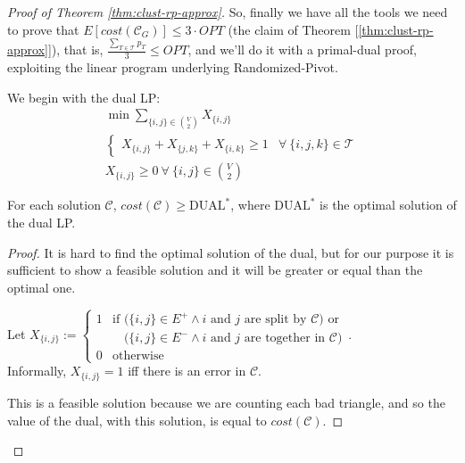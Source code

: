 \begin{proof}[Proof of Theorem \ref{thm:clust-rp-approx}]
    So, finally we have all the tools we need to prove that $E\left[cost\left( \mathscr{C}_G \right)\right] \leq 3 \cdot OPT$ (the claim of Theorem [\ref{thm:clust-rp-approx}]), that is, $\frac{\sum_{T \in \mathscr{T}} p_T}{3} \leq OPT$, and we'll do it with a primal-dual proof, exploiting the linear program underlying Randomized-Pivot.
    
    We begin with the dual LP:
    \begin{equation}\label{lp:clust-dual}
        \begin{aligned}
            &\min \sum_{\{i,j\} \in \binom{V}{2}} X_{\{i,j\}}&\\
            &\begin{cases}
                X_{\{i,j\}} + X_{\{j,k\}} + X_{\{i,k\}} \geq 1 & \forall\ \{i,j,k\} \in \mathscr{T}
            \end{cases}&\\
            &X_{\{i,j\}} \geq 0 \ \forall\ \{i,j\} \in \binom{V}{2}&
        \end{aligned}
    \end{equation}
    
    \begin{lem}\label{l:clust-3}
        For each solution $\mathscr{C}$, $cost(\mathscr{C}) \geq \text{DUAL}^*$, where $\text{DUAL}^*$ is the optimal solution of the dual LP.
    \end{lem}
    \begin{proof}
        It is hard to find the optimal solution of the dual, but for our purpose it is sufficient to show a feasible solution and it will be greater or equal than the optimal one.
        
        Let $X_{\{i,j\}} := \begin{cases}
        1 & \text{if } \big( \{i,j\} \in E^+ \wedge i \text{ and } j \text{ are split by } \mathscr{C} \big) \text{ or }\\
        &\phantom{\text{if }} \big( \{i,j\} \in E^- \wedge i \text{ and } j \text{ are together in } \mathscr{C} \big)\\
        0 & \text{otherwise}
        \end{cases}$.\\
        Informally, $X_{\{i,j\}}=1$ iff there is an error in $\mathscr{C}$.
        
        This is a feasible solution because we are counting each bad triangle, and so the value of the dual, with this solution, is equal to $cost(\mathscr{C})$.
    \end{proof}
    

\end{proof}
